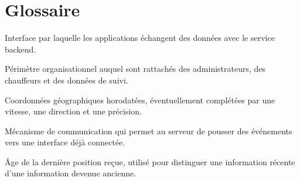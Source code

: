 \documentclass[11pt,a4paper,oneside]{report}
\begin{document}
\appendix
\chapter{Glossaire}

\begin{description}[style=nextline,leftmargin=3.2cm,labelwidth=2.9cm]
  \item[API] Interface par laquelle les applications échangent des données
        avec le service backend.
  \item[Centre] Périmètre organisationnel auquel sont rattachés des
        administrateurs, des chauffeurs et des données de suivi.
  \item[Position] Coordonnées géographiques horodatées, éventuellement
        complétées par une vitesse, une direction et une précision.
  \item[WebSocket] Mécanisme de communication qui permet au serveur de pousser
        des événements vers une interface déjà connectée.
  \item[Fraîcheur] Âge de la dernière position reçue, utilisé pour distinguer
        une information récente d'une information devenue ancienne.
\end{description}
\end{document}
